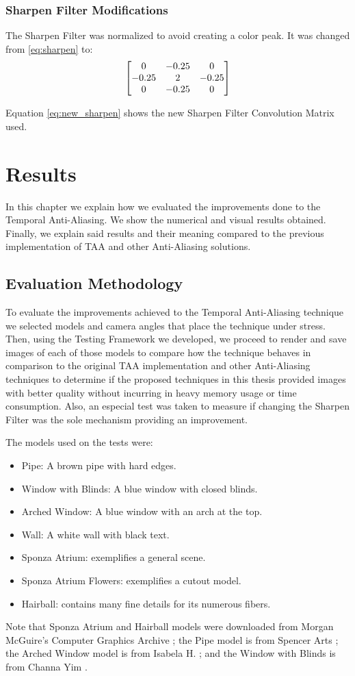 \documentclass{cslthse-msc}
\begin{document}
\subsection{Sharpen Filter Modifications}
The Sharpen Filter was normalized to avoid creating a color peak. It was changed from \ref{eq:sharpen} to:
\begin{equation} \label{eq:new_sharpen}
\centering
\begin{bmatrix*}[c]
0 & -0.25 &  0 \\
-0.25  &  2 & -0.25  \\
0 & -0.25  &  0
\end{bmatrix*}
\end{equation}

Equation \ref{eq:new_sharpen} shows the new Sharpen Filter Convolution Matrix used.


\chapter{Results}
In this chapter we explain how we evaluated the improvements done to the Temporal Anti-Aliasing. We show the numerical and visual results obtained. Finally, we explain said results and their meaning compared to the previous implementation of TAA and other Anti-Aliasing solutions.
\section{Evaluation Methodology}
To evaluate the improvements achieved to the Temporal Anti-Aliasing technique we selected models and camera angles that place the technique under stress. Then, using the Testing Framework we developed, we proceed to render and save images of each of those models to compare how the technique behaves in comparison to the original TAA implementation and other Anti-Aliasing techniques to determine if the proposed techniques in this thesis provided images with better quality without incurring in heavy memory usage or time consumption. Also, an especial test was taken to measure if changing the Sharpen Filter was the sole mechanism providing an improvement.

The models used on the tests were:
\begin{itemize}
\item Pipe: A brown pipe with hard edges.
\item Window with Blinds: A blue window with closed blinds.
\item Arched Window: A blue window with an arch at the top.
\item Wall: A white wall with black text.
\item Sponza Atrium: exemplifies a general scene.
\item Sponza Atrium Flowers: exemplifies a cutout model.
\item Hairball: contains many fine details for its numerous fibers.
\end{itemize}
Note that Sponza Atrium and Hairball models were downloaded from Morgan McGuire's Computer Graphics Archive \cite{McGuire2017Data}; the Pipe model is from Spencer Arts \cite{Spencer2010}; the Arched Window model is from Isabela H. \cite{Isabela2016}; and the Window with Blinds is from Channa Yim \cite{Channa2015}.
\end{document}
